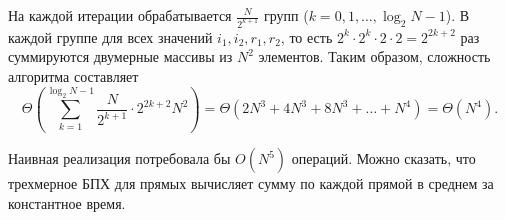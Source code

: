 На каждой итерации обрабатывается $\frac{N}{2^{k+1}}$ групп ($k=0, 1, \dots, \log_2 N - 1$). В каждой группе для всех значений $i_1, i_2, r_1, r_2$, то есть $2^{k} \cdot 2^{k} \cdot 2 \cdot 2 = 2^{2k+2}$ раз суммируются двумерные массивы из $N^2$ элементов. Таким образом, сложность алгоритма составляет
\begin{equation*}
    \Theta\left( \sum_{k=1}^{\log_2 N - 1} \frac{N}{2^{k+1}} \cdot 2^{2k+2} N^2 \right) =
    \Theta\left( 2N^3 + 4N^3 + 8N^3 + \dots + N^4 \right) =
    \Theta\left( N^4 \right).
\end{equation*}

Наивная реализация потребовала бы $O(N^5)$ операций. Можно сказать, что трехмерное БПХ для прямых вычисляет сумму по каждой прямой в среднем за константное время.




